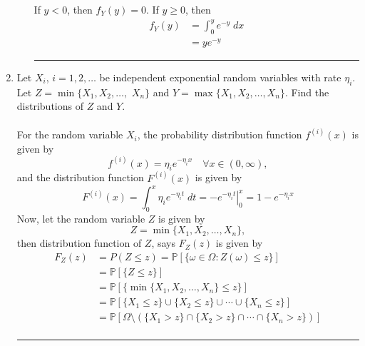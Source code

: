 \documentclass[twoside]{article}
\theoremstyle{definition}
\theoremstyle{remark}
\newenvironment{sol}{{\bf Solution:}}{\hfill\rule{2mm}{2mm}}
\begin{document}
\begin{enumerate}
\begin{enumerate}
\begin{sol}
      If $y < 0$, then $f_Y(y) = 0$. If $y \geq 0$, then
      \begin{equation*}
        \begin{split}
          f_Y(y)
          &= \int_{0}^{y} e^{-y}\; dx \\
          &= y e^{-y}
        \end{split}
      \end{equation*}
    \end{sol}
  \end{enumerate}

  \clearpage
  \item Let $X_i$, $i = 1, 2, \ldots$ be independent exponential random variables
  with rate $\eta_i$. Let $Z = \min \{X_1, X_2, \ldots,$ $X_n\}$ and $Y = \max \{
  X_1, X_2, \ldots, X_n \}$. Find the distributions of $Z$ and $Y$. \\
  \begin{sol} \\
    For the random variable $X_i$, the probability distribution function $f^{(i)}(x)$ is given
    by
    \begin{equation*}
      f^{(i)}(x) = \eta_i e^{-\eta_i x} \quad \forall x \in (0, \infty),
    \end{equation*}
    and the distribution function $F^{(i)}(x)$ is given by
    \begin{equation*}
      F^{(i)}(x)
      = \int_{0}^{x} \eta_i e^{-\eta_i t} \;dt
      = \left. -e^{-\eta_i t} \right|_{0}^{x}
      = 1 - e^{-\eta_i x}
    \end{equation*}
    Now, let the random variable $Z$ is given by
    \begin{equation*}
      Z = \min{ \{ X_1, X_2, \ldots, X_n \} },
    \end{equation*}
    then distribution function of $Z$, says $F_Z(z)$ is given by
    \begin{equation*}
      \begin{split}
        F_Z(z)
        &= P(Z \leq z) = \mathbb{P}[\{ \omega \in \Omega : Z(\omega) \leq z \}] \\
        &= \mathbb{P}[\{ Z \leq z \}] \\
        &= \mathbb{P}[\{ \min{ \{ X_1, X_2, \ldots, X_n \} } \leq z \}] \\
        &= \mathbb{P}[\{X_1 \leq z\} \cup \{X_2 \leq z\} \cup \cdots \cup \{X_n \leq z\}] \\
        &= \mathbb{P}[\Omega \setminus (\{X_1 > z\} \cap \{X_2 > z\} \cap \cdots \cap \{X_n > z\})] \\

\end{split}
\end{equation*}
\end{sol}
\end{enumerate}
\end{document}
